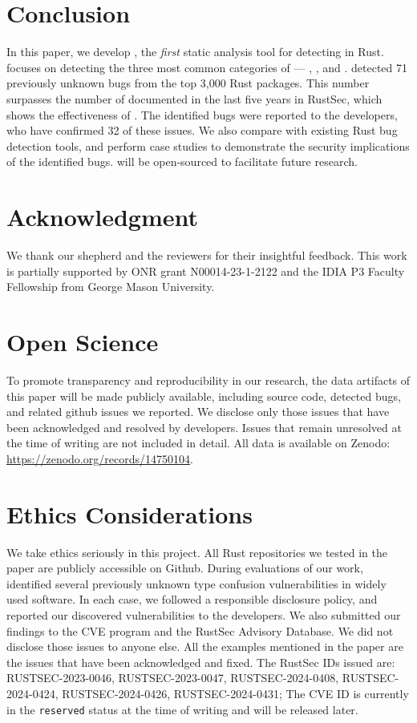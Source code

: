 \section{Conclusion}

In this paper, we develop \TN, the {\it first} static analysis tool for detecting \bugs in Rust. 
\TN focuses on detecting the three most common categories of \bugs --- \bone, \btwo, and \bthree.
%
\TN detected {71} previously unknown bugs from the top 3,000 Rust packages. 
This number surpasses the number of \bugs documented in the last five years in RustSec,
which shows the effectiveness of \TN.
The identified bugs were reported to the developers, who have confirmed {32} of these issues.
%
We also compare \TN with existing Rust bug detection tools, 
and perform case studies to demonstrate the security implications of the identified bugs.
\TN will be open-sourced to facilitate future research.





\section*{Acknowledgment}
We thank our shepherd and the reviewers for their insightful
feedback. This work is partially supported by ONR grant N00014-23-1-2122 and the IDIA P3 Faculty Fellowship from George Mason University.

\section*{Open Science}

To promote transparency and reproducibility in our research, the data artifacts of this paper will be made publicly available, including source code, detected bugs, and related github issues we reported. We disclose only those issues that have been acknowledged and resolved by developers. Issues that remain unresolved at the time of writing are not included in detail.
All data is available on Zenodo: \url{https://zenodo.org/records/14750104}.



\section*{Ethics Considerations}
We take ethics seriously in this project.
All Rust repositories we tested in the paper are publicly accessible on Github.
During evaluations of our work, \TN identified several previously unknown type confusion vulnerabilities in widely used software. In each case, we followed a responsible disclosure policy, and reported our discovered vulnerabilities to the developers. We also submitted our findings to the CVE program and the RustSec Advisory Database. 
We did not disclose those issues to anyone else.
All the examples mentioned in the paper are the issues that have been acknowledged and fixed. 
The RustSec IDs issued are:
RUSTSEC-2023-0046, RUSTSEC-2023-0047, RUSTSEC-2024-0408, RUSTSEC-2024-0424, RUSTSEC-2024-0426, RUSTSEC-2024-0431;
The CVE ID is currently in the \texttt{reserved} status at the time of writing and will be released later.
